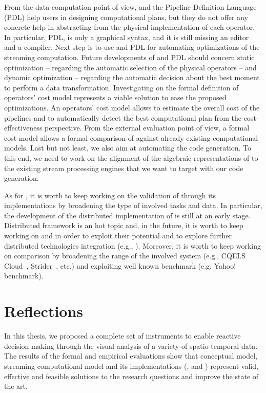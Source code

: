 From the data computation point of view, \river{} and the Pipeline Definition Language (PDL) help users in designing computational plans, but they do not offer any concrete help in abstracting from the physical implementation of each operator.
In particular, PDL, is only a graphical syntax, and it is still missing an editor and a compiler.
Next step is to use \river{} and PDL for automating optimizations of the streaming computation.
Future developments of \river{} and PDL should concern static optimization -- regarding the automatic selection of the physical operators -- and dynamic optimization -- regarding the automatic decision about the best moment to perform a data transformation.
Investigating on the formal definition of operators' cost model represents a viable solution to ease the proposed optimizations.
An operators' cost model allows to estimate the overall cost of the pipelines and to automatically detect the best computational plan from the cost-effectiveness perspective. 
From the external evaluation point of view, a formal cost model allows a formal comparison of \river{} against already existing computational models.
Last but not least, we also aim at automating the code generation.
To this end, we need to work on the alignment of the algebraic representations of \river{} to the existing stream processing engines that we want to target with our code generation.

As for \frappe{}, it is worth to keep working on the validation of \river{} through its implementations by broadening the type of involved tasks and data.
In particular, the development of the distributed implementation of \river{} is still at an early stage. 
Distributed framework is an hot topic and, in the future, it is worth to keep working on \sparkdi{} and \hivedi{} in order to exploit their potential and to explore further distributed technologies integration (e.g., \kafkadi{}).
Moreover, it is worth to keep working on comparison by broadening the range of the involved system (e.g., CQELS Cloud~\cite{DBLP:conf/semweb/PhuocQVH13}, Strider~\cite{DBLP:conf/semweb/RenC17}, etc.) and exploiting well known benchmark (e.g. Yahoo! benchmark).

\section{Reflections}

In this thesis, we proposed a complete set of instruments to enable reactive decision making through the visual analysis of a variety of spatio-temporal data.
The results of the formal and empirical evaluations show that \frappe{} conceptual model, \river{} streaming computational model and its implementations (\sti{}, \sparkdi{} and \hivedi{}) represent valid, effective and feasible solutions to the research questions and improve the state of the art.

